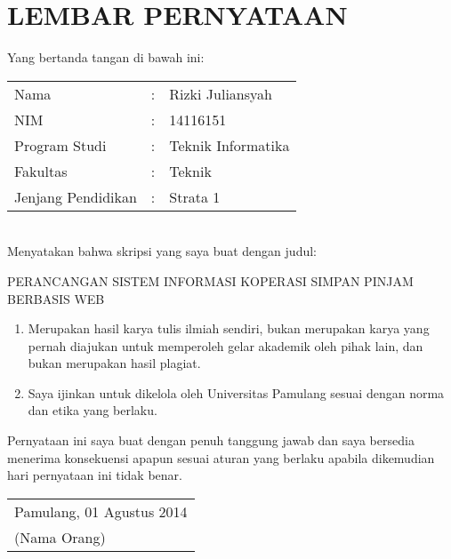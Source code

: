 %

\chapter*{\uppercase{LEMBAR PERNYATAAN}}
\vspace{1cm}

\noindent Yang bertanda tangan di bawah ini:
\renewcommand{\arraystretch}{1.5}
\begin{table}[ht]
\begin{adjustwidth}{-0.15cm}{}
	\begin{tabular}{lll}
		Nama & : & Rizki Juliansyah \\
		NIM & : & 14116151 \\
		Program Studi & : & Teknik Informatika \\
		Fakultas & : & Teknik \\
		Jenjang Pendidikan & : & Strata 1
	\end{tabular}
\end{adjustwidth}
\end{table} \\

\vspace{-1cm}
\noindent Menyatakan bahwa skripsi yang saya buat dengan judul:

\vspace{0.3cm}
\noindent PERANCANGAN SISTEM INFORMASI KOPERASI SIMPAN PINJAM BERBASIS WEB
\begin{enumerate}[nolistsep,leftmargin=0.5cm]
	\item Merupakan hasil karya tulis ilmiah sendiri, bukan merupakan karya yang pernah diajukan untuk memperoleh gelar akademik oleh pihak lain, dan bukan merupakan hasil plagiat.
	\item Saya ijinkan untuk dikelola oleh Universitas Pamulang sesuai dengan norma dan etika yang berlaku.
\end{enumerate}
Pernyataan ini saya buat dengan penuh tanggung jawab dan saya bersedia menerima konsekuensi apapun sesuai aturan yang berlaku apabila dikemudian hari pernyataan ini tidak benar.

\vspace{2cm}
\begin{table}[ht]
\begin{adjustwidth}{-0.15cm}{}
	\begin{tabular}{l}
	Pamulang, 01 Agustus 2014 \\[2cm]
	(Nama Orang)
	\end{tabular}
\end{adjustwidth}	
\end{table}

\newpage